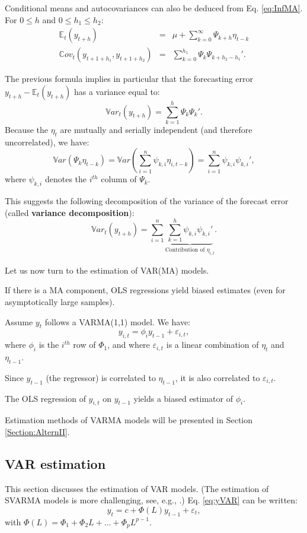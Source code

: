 \documentclass[
  12pt,
]{book}
\theoremstyle{definition}
\theoremstyle{definition}
\theoremstyle{definition}
\theoremstyle{definition}
\theoremstyle{remark}
\begin{document}
Conditional means and autocovariances can also be deduced from Eq. \eqref{eq:InfMA}. For \(0 \le h\) and \(0 \le h_1 \le h_2\):
\begin{eqnarray*}
\mathbb{E}_t(y_{t+h}) &=& \mu + \sum_{k=0}^\infty \Psi_{k+h} \eta_{t-k} \\
\mathbb{C}ov_t(y_{t+1+h_1},y_{t+1+h_2}) &=& \sum_{k=0}^{h_1} \Psi_{k}\Psi_{k+h_2-h_1}'.
\end{eqnarray*}

The previous formula implies in particular that the forecasting error \(y_{t+h} - \mathbb{E}_t(y_{t+h})\) has a variance equal to:
\[
\mathbb{V}ar_t(y_{t+h}) = \sum_{k=1}^{h} \Psi_{k}\Psi_{k}'.
\]
Because the \(\eta_t\) are mutually and serially independent (and therefore uncorrelated), we have:
\[
\mathbb{V}ar(\Psi_k \eta_{t-k}) = \mathbb{V}ar\left(\sum_{i=1}^n \psi_{k,i} \eta_{i,t-k}\right)  = \sum_{i=1}^n \psi_{k,i}\psi_{k,i}',
\]
where \(\psi_{k,i}\) denotes the \(i^{th}\) column of \(\Psi_k\).

This suggests the following decomposition of the variance of the forecast error (called \textbf{variance decomposition}):
\[
\mathbb{V}ar_t(y_{t+h}) = \sum_{i=1}^n \underbrace{\sum_{k=1}^{h}  \psi_{k,i}\psi_{k,i}'}_{\mbox{Contribution of $\eta_{i,t}$}}.
\]

Let us now turn to the estimation of VAR(MA) models.

If there is a MA component, OLS regressions yield biased estimates (even for asymptotically large samples).

Assume \(y_t\) follows a VARMA(1,1) model. We have:
\[
y_{i,t} = \phi_i y_{t-1} + \varepsilon_{i,t},
\]
where \(\phi_i\) is the \(i^{th}\) row of \(\Phi_1\), and where \(\varepsilon_{i,t}\) is a linear combination of \(\eta_t\) and \(\eta_{t-1}\).

Since \(y_{t-1}\) (the regressor) is correlated to \(\eta_{t-1}\), it is also correlated to \(\varepsilon_{i,t}\).

The OLS regression of \(y_{i,t}\) on \(y_{t-1}\) yields a biased estimator of \(\phi_i\).

Estimation methods of VARMA models will be presented in Section \ref{Section:AlternII}.

\hypertarget{estimVAR}{%
\subsection{VAR estimation}\label{estimVAR}}

This section discusses the estimation of VAR models. (The estimation of SVARMA models is more challenging, see, e.g., \citet{Gourieroux_Monfort_Renne_2020}.) Eq. \eqref{eq:yVAR} can be written:
\[
y_{t}=c+\Phi(L)y_{t-1}+\varepsilon_{t},
\]
with \(\Phi(L) = \Phi_1 + \Phi_2 L + \dots + \Phi_p L^{p-1}\).
\end{document}
